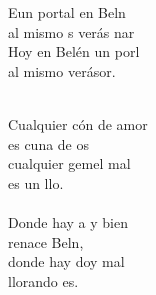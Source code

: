 \begin{cancion}[En un portal][]%
	\begin{chorus}%
	Eun portal  en Beln\\
	al mismo s verás nar \\
	Hoy en Belén un porl \\
	al mismo  verásor.\\
	\end{chorus}%
	\jump\\
	Cualquier cón de amor\\
	es cuna de os\\
	cualquier gemel mal\\
	es un llo.\\
	\jump\\
	Donde hay a y bien\\
	renace Beln,\\
	donde hay doy mal\\
	llorando es.\\
\end{cancion}%
